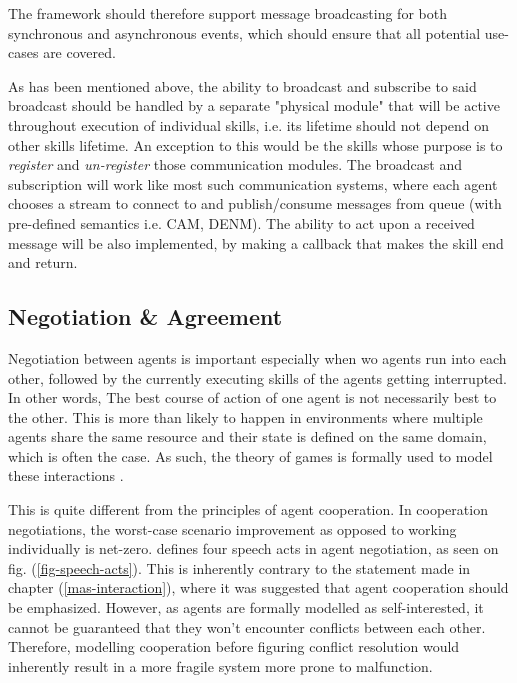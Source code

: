 \documentclass[main.tex]{subfiles}
\begin{document}
The framework should therefore support message broadcasting for both synchronous and 
asynchronous events, which should ensure that all potential use-cases are covered. 

As has been mentioned above, the ability to broadcast and subscribe to said broadcast should be
handled by a separate "physical module" that will be active throughout execution of individual
skills, i.e.  its lifetime should not depend on other skills lifetime. An exception to this
would be the skills whose purpose is to \emph{register} and \emph{un-register} those
communication modules.  The broadcast and subscription will work like most such communication
systems, where each agent chooses a stream to connect to and publish/consume messages from
queue (with pre-defined semantics i.e. CAM, DENM). The ability to act upon a received message
will be also implemented, by making a callback that makes the skill end and return. 

\subsection{Negotiation \& Agreement}
Negotiation between agents is important especially when wo agents run into each other, 
followed by the currently executing skills of the agents getting interrupted. In other words, 
The best course of action of one agent is not necessarily best to the other. This is more than
likely to happen in environments where multiple agents share the same resource and their state
is defined on the same domain, which is often the case. As such, the theory of games is formally 
used to model these interactions \cite{Binder2022}. 

This is quite different from the principles of agent cooperation. In cooperation negotiations, 
the worst-case scenario improvement as opposed to working individually is net-zero. \cite{Binder2022}
defines four speech acts in agent negotiation, as seen on fig. (\ref{fig-speech-acts}). This is 
inherently contrary to the statement made in chapter (\ref{mas-interaction}), where it was suggested 
that agent cooperation should be emphasized. However, as agents are formally modelled as self-interested, 
it cannot be guaranteed that they won't encounter conflicts between each other. Therefore, modelling 
cooperation before figuring conflict resolution would inherently result in a more fragile system 
more prone to malfunction. 
\end{document}
